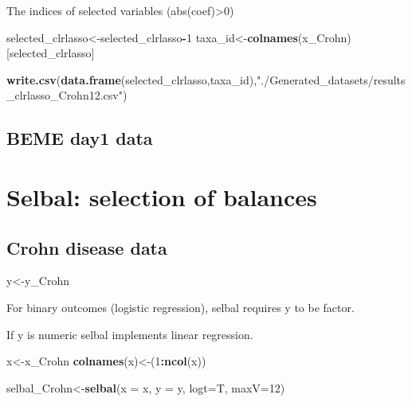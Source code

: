 \documentclass[]{book}
\newenvironment{Shaded}{\begin{snugshade}}{\end{snugshade}}
\newcommand{\KeywordTok}[1]{\textcolor[rgb]{0.13,0.29,0.53}{\textbf{#1}}}
\newcommand{\DataTypeTok}[1]{\textcolor[rgb]{0.13,0.29,0.53}{#1}}
\newcommand{\DecValTok}[1]{\textcolor[rgb]{0.00,0.00,0.81}{#1}}
\newcommand{\StringTok}[1]{\textcolor[rgb]{0.31,0.60,0.02}{#1}}
\newcommand{\OperatorTok}[1]{\textcolor[rgb]{0.81,0.36,0.00}{\textbf{#1}}}
\newcommand{\NormalTok}[1]{#1}
\begin{document}
The indices of selected variables (abs(coef)\textgreater{}0)

\begin{Shaded}
\begin{Highlighting}[]
\NormalTok{selected_clrlasso<-selected_clrlasso}\OperatorTok{-}\DecValTok{1}
\NormalTok{taxa_id<-}\KeywordTok{colnames}\NormalTok{(x_Crohn)[selected_clrlasso]}

\KeywordTok{write.csv}\NormalTok{(}\KeywordTok{data.frame}\NormalTok{(selected_clrlasso,taxa_id),}\StringTok{"./Generated_datasets/results_clrlasso_Crohn12.csv"}\NormalTok{)}
\end{Highlighting}
\end{Shaded}

\section{BEME day1 data}\label{beme-day1-data-2}

\chapter{Selbal: selection of balances}\label{selbal}

\section{Crohn disease data}\label{crohn-disease-data-3}

\begin{Shaded}
\begin{Highlighting}[]
\NormalTok{y<-y_Crohn  }
\end{Highlighting}
\end{Shaded}

For binary outcomes (logistic regression), selbal requires y to be
factor.

If y is numeric selbal implements linear regression.

\begin{Shaded}
\begin{Highlighting}[]
\NormalTok{x<-x_Crohn }
\KeywordTok{colnames}\NormalTok{(x)<-(}\DecValTok{1}\OperatorTok{:}\KeywordTok{ncol}\NormalTok{(x))}

\NormalTok{selbal_Crohn<-}\KeywordTok{selbal}\NormalTok{(}\DataTypeTok{x =}\NormalTok{ x, }\DataTypeTok{y =}\NormalTok{ y, }\DataTypeTok{logt=}\NormalTok{T, }\DataTypeTok{maxV=}\DecValTok{12}\NormalTok{)}
\end{Highlighting}
\end{Shaded}
\end{document}

